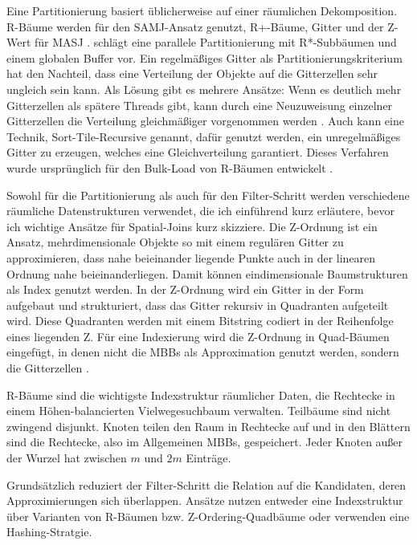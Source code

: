 \documentclass[a4paper,12pt,twoside]{article}
\begin{document}
{Eine Partitionierung basiert üblicherweise auf einer räumlichen Dekomposition. R-Bäume werden für den SAMJ-Ansatz genutzt, R+-Bäume, Gitter und der Z-Wert für MASJ \parencite{Zhou1998}. {\textcite{Brinkhoff1996}} schlägt eine parallele Partitionierung mit R*-Subbäumen und einem globalen Buffer vor. Ein regelmäßiges Gitter als Partitionierungskriterium hat den Nachteil, dass eine Verteilung der Objekte auf die Gitterzellen sehr ungleich sein kann. Als Lösung gibt es mehrere Ansätze: Wenn es deutlich mehr Gitterzellen als spätere Threads gibt, kann durch eine Neuzuweisung einzelner Gitterzellen die Verteilung gleichmäßiger vorgenommen werden \parencite{Patel1996}. Auch kann eine Technik, Sort-Tile-Recursive genannt, dafür genutzt werden, ein unregelmäßiges Gitter zu erzeugen, welches eine Gleichverteilung garantiert. Dieses Verfahren wurde ursprünglich für den Bulk-Load von R-Bäumen entwickelt \parencite{Leutenegger1997}.

Sowohl für die Partitionierung als auch für den Filter-Schritt werden verschiedene räumliche Datenstrukturen verwendet, die ich einführend kurz erläutere, bevor ich wichtige Ansätze für Spatial-Joins kurz skizziere. Die Z-Ordnung ist ein Ansatz, mehrdimensionale Objekte so mit einem regulären Gitter zu approximieren, dass nahe beieinander liegende Punkte auch in der linearen Ordnung nahe beieinanderliegen. Damit können eindimensionale Baumstrukturen als Index genutzt werden. In der Z-Ordnung wird ein Gitter in der Form aufgebaut und strukturiert, dass das Gitter rekursiv in Quadranten aufgeteilt wird. Diese Quadranten werden mit einem Bitstring codiert in der Reihenfolge eines liegenden Z. Für eine Indexierung wird die Z-Ordnung in Quad-Bäumen eingefügt, in denen nicht die MBBs als Approximation genutzt werden, sondern die Gitterzellen \parencite[S. 227ff]{Rigaux2001}.

R-Bäume sind die wichtigste Indexstruktur räumlicher Daten, die Rechtecke in einem Höhen-balancierten Vielwegesuchbaum verwalten. Teilbäume sind nicht zwingend disjunkt. Knoten teilen den Raum in Rechtecke auf und in den Blättern sind die Rechtecke, also im Allgemeinen MBBs, gespeichert. Jeder Knoten außer der Wurzel hat zwischen $m$ und $2 m$ Einträge.

Grundsätzlich reduziert der Filter-Schritt die Relation auf die Kandidaten, deren Approximierungen sich überlappen. Ansätze nutzen entweder eine Indexstruktur über Varianten von R-Bäumen bzw. Z-Ordering-Quadbäume oder verwenden eine Hashing-Stratgie.

}
\end{document}
